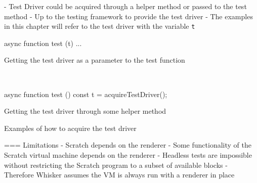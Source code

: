 - Test Driver could be acquired through a helper method or passed to the test method
- Up to the testing framework to provide the test driver
- The examples in this chapter will refer to the test driver with the variable \texttt{t}

\begin{listing}[ht]
    \centering
    \begin{minipage}[t]{.45\textwidth}
        \begin{javascriptcode}
            async function test (t) {
                ...
            }
        \end{javascriptcode}
        \vspace{-\bigskipamount}
        Getting the test driver as a parameter to the test function
    \end{minipage}
    ~
    \begin{minipage}[t]{.45\textwidth}
        \begin{javascriptcode}
            async function test () {
                const t = acquireTestDriver();
            }
        \end{javascriptcode}
        \vspace{-\bigskipamount}
        Getting the test driver through some helper method
    \end{minipage}
    \caption{Examples of how to acquire the test driver}
    \label{fig:examples_of_how_to_acquire_the_test_driver}
\end{listing}

=== Limitations
- Scratch depends on the renderer
    - Some functionality of the Scratch virtual machine depends on the renderer
    - Headless tests are impossible without restricting the Scratch program to a subset of available blocks
- Therefore Whisker assumes the VM is always run with a renderer in place

